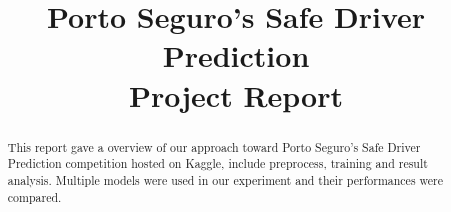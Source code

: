 \documentclass[conference]{IEEEtran}
\begin{document}
\title{Porto Seguro's Safe Driver Prediction\\Project Report}
\author{
}

\maketitle

\begin{abstract}
This report gave a overview of our approach toward Porto Seguro's Safe Driver
Prediction competition hosted on Kaggle, include preprocess, training and
result analysis. Multiple models were used in our experiment and their
performances were compared.

\end{abstract}















{}



\end{document}
